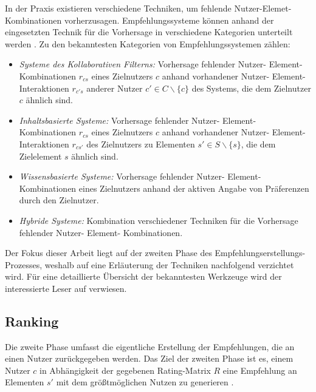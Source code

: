 In der Praxis existieren verschiedene Techniken, um fehlende Nutzer-Elemet-Kombinationen vorherzusagen.
Empfehlungssysteme können anhand der eingesetzten Technik für die Vorhersage in verschiedene Kategorien unterteilt werden \cite[S. 8 ff]{recommenderSystems:2016}.
Zu den bekanntesten Kategorien von Empfehlungssystemen zählen:
\begin{itemize}%
	\item \textit{Systeme des Kollaborativen Filterns:} Vorhersage fehlender Nutzer- Element- Kombinationen $r_{cs}$ eines Zielnutzers $c$ anhand vorhandener Nutzer- Element- Interaktionen $r_{c's}$ anderer Nutzer $c' \in C \backslash \{c\}$ des Systems, die dem Zielnutzer $c$ ähnlich sind.
	\item \textit{Inhaltsbasierte Systeme:} Vorhersage fehlender Nutzer- Element- Kombinationen $r_{cs}$ eines Zielnutzers $c$ anhand vorhandener Nutzer- Element- Interaktionen $r_{cs'}$ des Zielnutzers zu Elementen $s' \in S \backslash \{s\}$, die dem Zielelement $s$ ähnlich sind.
	\item \textit{Wissensbasierte Systeme:} Vorhersage fehlender Nutzer- Element- Kombinationen eines Zielnutzers anhand der aktiven Angabe von Präferenzen durch den Zielnutzer.
	\item \textit{Hybride Systeme:} Kombination verschiedener Techniken für die Vorhersage fehlender Nutzer- Element- Kombinationen.
\end{itemize}

Der Fokus dieser Arbeit liegt auf der zweiten Phase des Empfehlungserstellungs-Prozesses, weshalb auf eine Erläuterung der Techniken nachfolgend verzichtet wird.
Für eine detaillierte Übersicht der bekanntesten Werkzeuge wird der interessierte Leser auf \textcite[S. 8ff]{recommenderSystems:2016} verwiesen.

\subsection{Ranking}
\label{ch:empfehlungssysteme:empfehlungserstellung:recommendation}
Die zweite Phase umfasst die eigentliche Erstellung der Empfehlungen, die an einen Nutzer zurückgegeben werden.
Das Ziel der zweiten Phase ist es, einem Nutzer $c$ in Abhängigkeit der gegebenen Rating-Matrix $R$ eine Empfehlung an Elementen $s'$ mit dem größtmöglichen Nutzen zu generieren \cite[S. 6]{ekstrand:article}.

